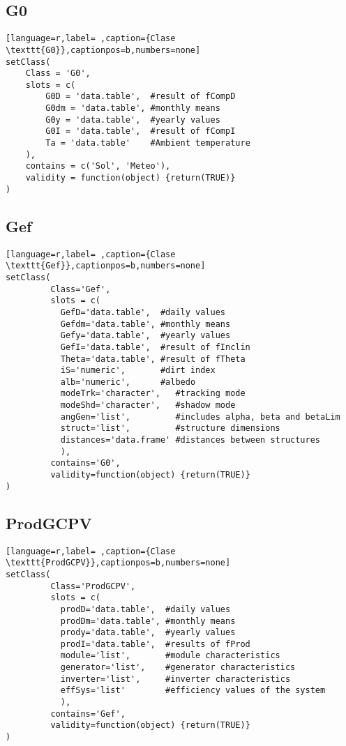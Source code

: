 \subsection{G0}
\label{sec:org6e7462a}
\label{subsec:g0}
\begin{lstlisting}[language=r,label= ,caption={Clase \texttt{G0}},captionpos=b,numbers=none]
setClass(
    Class = 'G0',
    slots = c(
        G0D = 'data.table',  #result of fCompD
        G0dm = 'data.table', #monthly means
        G0y = 'data.table',  #yearly values
        G0I = 'data.table',  #result of fCompI
        Ta = 'data.table'    #Ambient temperature
    ),
    contains = c('Sol', 'Meteo'),
    validity = function(object) {return(TRUE)}
)

\end{lstlisting}
\subsection{Gef}
\label{sec:orgde4924e}
\label{subsec:gef}
\begin{lstlisting}[language=r,label= ,caption={Clase \texttt{Gef}},captionpos=b,numbers=none]
setClass(
         Class='Gef',
         slots = c(
           GefD='data.table',  #daily values
           Gefdm='data.table', #monthly means
           Gefy='data.table',  #yearly values
           GefI='data.table',  #result of fInclin
           Theta='data.table', #result of fTheta
           iS='numeric',       #dirt index
           alb='numeric',      #albedo
           modeTrk='character',   #tracking mode
           modeShd='character',   #shadow mode
           angGen='list',         #includes alpha, beta and betaLim
           struct='list',         #structure dimensions
           distances='data.frame' #distances between structures
           ),
         contains='G0',
         validity=function(object) {return(TRUE)}
)
\end{lstlisting}
\subsection{ProdGCPV}
\label{sec:org7896825}
\label{subsec:clase-prodgcpv}
\begin{lstlisting}[language=r,label= ,caption={Clase \texttt{ProdGCPV}},captionpos=b,numbers=none]
setClass(
         Class='ProdGCPV',
         slots = c(
           prodD='data.table',  #daily values
           prodDm='data.table', #monthly means
           prody='data.table',  #yearly values
           prodI='data.table',  #results of fProd
           module='list',       #module characteristics
           generator='list',    #generator characteristics
           inverter='list',     #inverter characteristics
           effSys='list'        #efficiency values of the system
           ),
         contains='Gef',
         validity=function(object) {return(TRUE)}
)
\end{lstlisting}
